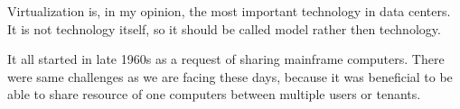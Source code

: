 
Virtualization is, in my opinion, the most important technology in data centers. It is not technology itself, so it should be called model rather then technology. 

It all started in late 1960s as a request of sharing mainframe computers. There were same challenges as we are facing these days, because it was beneficial to be able to share resource of one computers between multiple users or tenants. 
